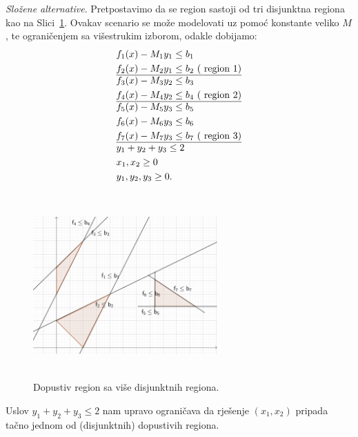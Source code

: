 \documentclass[a4paper, utf8, 11pt, colorlinks]{book}
\begin{document}
\emph{Složene alternative}. Pretpostavimo da se region sastoji od tri disjunktna regiona kao na Slici~\ref{fig:compound_regions}. Ovakav scenario se može modelovati uz pomoć konstante veliko $M$, te  ograničenjem sa višestrukim izborom, odakle dobijamo:
\begin{align*}
    &f_1(x) - M_1 y_1 \leq b_1 \\
    &f_2(x) - M_2 y_1 \leq b_2\ (\mbox{ region 1}) \\ \hline
    & f_3(x) - M_3 y_2 \leq b_3 \\ 
    & f_4(x) - M_4 y_2 \leq b_4\ (\mbox{ region 2})\\  \hline 
    & f_5(x) - M_5 y_3 \leq b_5 \\
    & f_6(x) - M_6 y_3 \leq b_6 \\
    & f_7(x) - M_7 y_3 \leq b_7\ (\mbox{ region 3}) \\ \hline
    & y_1 + y_2 + y_3 \leq 2 \\
    & x_1, x_2 \geq 0 \\
    & y_1, y_2, y_3 \geq 0.
\end{align*}

\begin{figure}[!ht]
    \centering
    \includegraphics[width=200pt, height=200pt]{compound.eps}
    \caption{Dopustiv region sa više disjunktnih regiona.}
    \label{fig:compound_regions}
\end{figure}
Uslov $y_1 + y_2 + y_3 \leq 2$ nam upravo ograničava da rješenje $(x_1, x_2)$ pripada tačno jednom od (disjunktnih) dopustivih regiona. 
\end{document}

